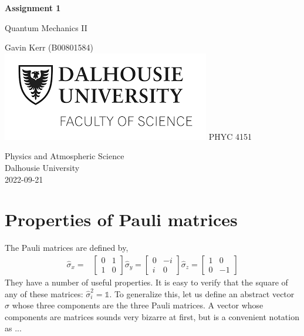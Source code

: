 \documentclass[12pt, a4paper]{article}
\begin{document}
\begin{titlepage}
   \begin{center}
       \vspace*{0.5cm}

       \LARGE{\textbf{Assignment 1}}

       \vspace{1cm}
        \Large{Quantum Mechanics II}
            
       \vspace{1cm}
		\small{Gavin Kerr (B00801584)} \\
		\vfill
		\includegraphics[scale=0.65]{dal_logo2.png}
       \vfill
           \large{PHYC 4151}
            
       \vspace{0.8cm}
     
            
       Physics and Atmospheric Science\\
       Dalhousie University\\
       2022-09-21
            
   \end{center}
\end{titlepage}




\section{Properties of Pauli matrices}
The Pauli matrices are defined by,
\begin{align*}
\hat{\sigma}_x =&
\begin{bmatrix}
0&1\\1&0
\end{bmatrix}
\hat{\sigma}_y =
\begin{bmatrix}
0&-i\\i&0
\end{bmatrix}
\hat{\sigma}_z =
\begin{bmatrix}
1&0\\0&-1
\end{bmatrix}
\end{align*}
They have a number of useful properties. It is easy to verify that the square of any of these matrices: $\hat{\sigma}_i^2 = \mathds{1}$. To generalize this, let us define an abstract vector $\hat{\sigma}$ whose three components are the three Pauli matrices. A vector whose components are matrices sounds very bizarre at first, but is a convenient notation as ...
\end{document}

